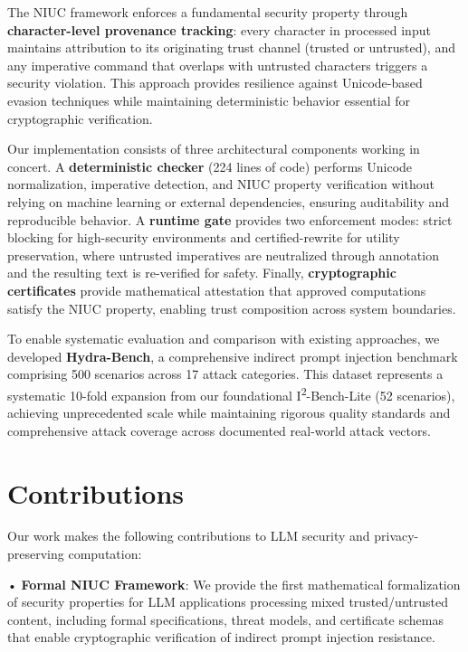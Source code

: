 The NIUC framework enforces a fundamental security property through \textbf{character-level provenance tracking}: every character in processed input maintains attribution to its originating trust channel (trusted or untrusted), and any imperative command that overlaps with untrusted characters triggers a security violation. This approach provides resilience against Unicode-based evasion techniques while maintaining deterministic behavior essential for cryptographic verification.

Our implementation consists of three architectural components working in concert. A \textbf{deterministic checker} (224 lines of code) performs Unicode normalization, imperative detection, and NIUC property verification without relying on machine learning or external dependencies, ensuring auditability and reproducible behavior. A \textbf{runtime gate} provides two enforcement modes: strict blocking for high-security environments and certified-rewrite for utility preservation, where untrusted imperatives are neutralized through annotation and the resulting text is re-verified for safety. Finally, \textbf{cryptographic certificates} provide mathematical attestation that approved computations satisfy the NIUC property, enabling trust composition across system boundaries.

To enable systematic evaluation and comparison with existing approaches, we developed \textbf{Hydra-Bench}, a comprehensive indirect prompt injection benchmark comprising 500 scenarios across 17 attack categories. This dataset represents a systematic 10-fold expansion from our foundational I\textsuperscript{2}-Bench-Lite (52 scenarios), achieving unprecedented scale while maintaining rigorous quality standards and comprehensive attack coverage across documented real-world attack vectors.

\section{Contributions}

Our work makes the following contributions to LLM security and privacy-preserving computation:

• \textbf{Formal NIUC Framework}: We provide the first mathematical formalization of security properties for LLM applications processing mixed trusted/untrusted content, including formal specifications, threat models, and certificate schemas that enable cryptographic verification of indirect prompt injection resistance.

